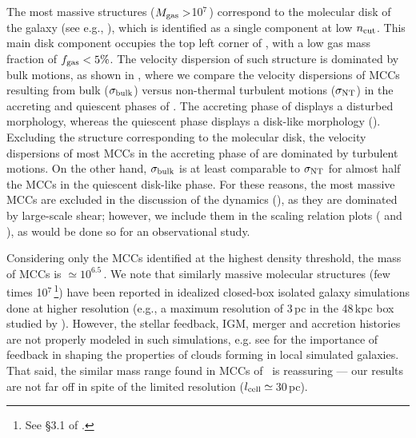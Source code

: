 \IfFileExists{emulateapjlegacy.cls}{\documentclass[iop]{emulateapjlegacy}}{\documentclass[iop]{emulateapj}}
\begin{document}
The most massive structures ($M_{\rm gas}>$10$^7$\,\Msun) correspond to the molecular disk of the galaxy (see e.g., ), which is identified as a single component at low $n_{\rm cut}$. This main disk component occupies the top left corner of , with a low gas mass fraction of $f_{\rm gas}< 5\%$. The velocity dispersion of such structure is dominated by bulk motions, as shown in , where we compare the velocity dispersions of MCCs resulting from bulk ($\sigma_{\rm bulk}$) versus non-thermal turbulent motions ($\sigma_{\rm NT}$) in the accreting and quiescent phases of \flower. The accreting phase of \flower displays a disturbed morphology, whereas the quiescent phase displays a disk-like morphology ().
%
Excluding the structure corresponding to the molecular disk, the velocity dispersions of most MCCs in the accreting phase of \flower are dominated by turbulent motions. On the other hand, $\sigma_{\rm bulk}$ is at least comparable to $\sigma_{\rm NT}$ for almost half the MCCs in the quiescent disk-like phase.
%
For these reasons, the most massive MCCs are excluded in the discussion of the dynamics (), as they are dominated by large-scale shear; however, we include them in the scaling relation plots ( and ), as would be done so for an observational study.

Considering only the MCCs identified at the highest density threshold, the mass of MCCs is $\simeq10^{6.5}$\,\Msun. We note that similarly massive molecular structures (few times 10$^7$\,\Msun\footnote{See \S{3.1} of \citet{Behrendt16a}.}) have been reported in idealized closed-box isolated galaxy simulations done at higher resolution (e.g., a maximum resolution of 3\,pc in the 48\,kpc box studied by \citealt{Behrendt16a}). However, the stellar feedback, IGM, merger and accretion histories are not properly modeled in such simulations, e.g. see \citet{grisdale:2017,grisdale:2019} for the importance of feedback in shaping the properties of clouds forming in local simulated galaxies. That said, the similar mass range found in MCCs of \flower\ is reassuring --- our results are not far off in spite of the limited resolution ($l_{\rm cell}\simeq$\,30\,pc).
\end{document}
